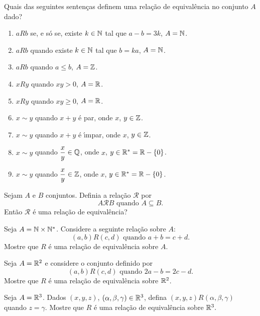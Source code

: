 \documentclass[12pt]{exam}
\begin{document}
\questao{} Quais das seguintes senten{\c c}as definem uma rela{\c c}{\~a}o de equival{\^e}ncia no conjunto $A$ dado?
\begin{enumerate}[label={\alph*})]
    \item $aRb$ se, e s{\'o} se, existe $k \in \mathbb{N}$ tal que $a - b = 3k$, $A = \mathbb{N}$.
    \item $aRb$ quando existe $k \in \mathbb{N}$ tal que $b = k a$, $A = \mathbb{N}$.
    \item $aRb$ quando $a \le b$, $A = \mathbb{Z}$.
    \item $xRy$ quando $xy > 0$, $ A = \mathbb{R}$.
    \item $xRy$ quando $xy \ge 0$, $ A = \mathbb{R}$.
    \item $x \sim y$ quando $x + y$ \'e par, onde $x$, $y \in \mathbb{Z}$.
    \item $x \sim y$ quando $x + y$ \'e {\'\i}mpar, onde $x$, $y \in \mathbb{Z}$.
    \item $x \sim y$ quando $\dfrac{x}{y} \in \mathbb{Q}$, onde $x$, $y \in \mathbb{R}^* = \mathbb{R} - \{0\}$.
    \item $x \sim y$ quando $\dfrac{x}{y} \in \mathbb{Z}$, onde $x$, $y \in \mathbb{R}^* = \mathbb{R} - \{0\}$.
\end{enumerate}

\vspace{.3cm}

\questao{} Sejam $A$ e $B$ conjuntos. Definia a rela{\c c}ão $\mathcal{R}$ por
\[
    A \mathcal{R} B \mbox{ quando } A \subseteq B.
\]
Então $\mathcal{R}$ é uma rela{\c c}ão de equivalência?

\vspace{.3cm}

\questao{} Seja $A = \mathbb{N} \times \mathbb{N}^*$. Considere a seguinte
rela{\c c}{\~a}o sobre $A$:
\[
    (a,b) R (c,d) \mbox{ quando } a + b = c + d.
\]
Mostre que $R$ {\'e} uma rela{\c c}{\~a}o de equival{\^e}ncia sobre $A$.

\vspace{.3cm}

\questao{} Seja $A = \mathbb{R}^2$ e considere o conjunto definido por
\[
  (a,b)R(c,d) \mbox{ quando } 2a - b = 2c - d.
\]
Mostre que $R$ \'e uma rela\c{c}\~ao de equival\^encia sobre $\mathbb{R}^2$.

\vspace{.3cm}

\questao{} Seja $A = \mathbb{R}^3$. Dados $(x, y, z)$, $(\alpha, \beta, \gamma) \in \mathbb{R}^3$, defina $(x, y, z) R (\alpha, \beta, \gamma)$ quando $z = \gamma$. Mostre que $R$ \'e uma rela\c{c}\~ao de equival\^encia sobre $\mathbb{R}^3.$
\end{document}
